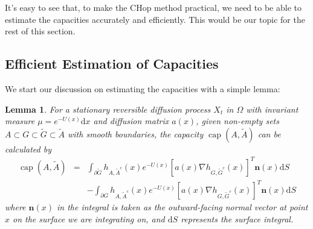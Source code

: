 \documentclass[english, aip, jcp, priprint, graphicx]{revtex4-1}
\newcommand{\mathd}{\mathrm{d}}
\newtheorem{lemma}{Lemma}
\theoremstyle{plain}
\theoremstyle{definition}
\theoremstyle{plain}
\begin{document}
It's easy to see that, to make the CHop method practical, we need to be able to estimate the capacities accurately and efficiently. This would be our topic for the rest of this section.

\subsection{Efficient Estimation of Capacities}

We start our discussion on estimating the capacities with a simple lemma:
\begin{lemma}\label{thm:capacity_lemma}
For a stationary reversible  diffusion process $X_t$ in $\Omega$ with
invariant measure ${\mu}= e^{- U (x)} \mathrm{d} x$ and diffusion matrix
$a (x)$, given non-empty sets $A \subset G \subset \tilde{G} \subset
\tilde{A}$ with smooth boundaries, the capacity
$\ensuremath{\operatorname{cap}} (A, \tilde{A})$ can be calculated by
\begin{eqnarray*}
\ensuremath{\operatorname{cap}} (A, \tilde{A}) & = & \int_{\partial
\tilde{G}}  h_{A,
\tilde{A}^c} (x) e^{- U (x)} [a (x) \nabla h_{G, \tilde{G}^c} (x)]^T \textbf{n} (x)\mathd S\\
&   & - \int_{\partial G}  h_{A, \tilde{A}^c} (x) e^{- U (x)} [a (x) \nabla h_{G, \tilde{G}^c} (x)]^T \textbf{n} (x)\mathd S
\end{eqnarray*}
where ${\textbf{n}} (x)$ in the integral is taken as the outward-facing normal vector at point $x$ on the surface we are integrating on, and $\mathd S$ represents the surface integral.
\end{lemma}
\end{document}
